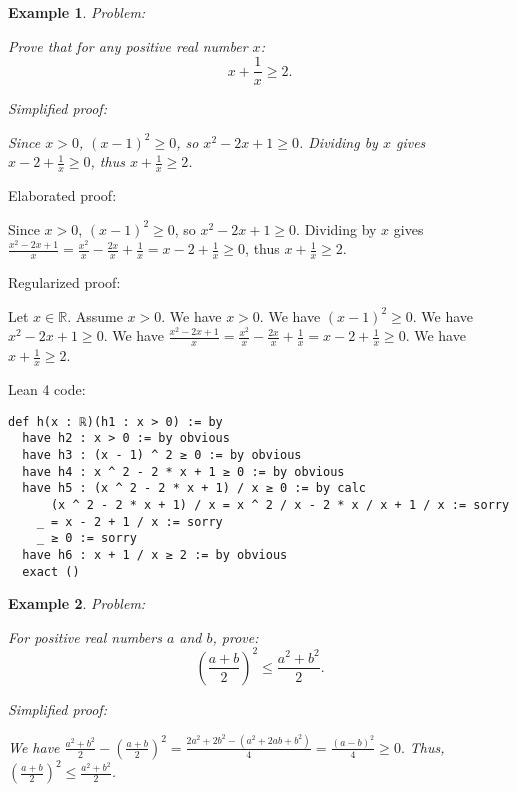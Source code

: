\documentclass{article}
\newtheorem{example}{Example}
\begin{document}
\begin{example}
Problem:
\begin{tcolorbox}[colback=yellow!10, width=\linewidth]
Prove that for any positive real number $x$:
    $$x + \frac{1}{x} \geq 2.$$
\end{tcolorbox}

Simplified proof:
\begin{tcolorbox}[colback=blue!10, width=\linewidth]
Since $x>0$, $(x-1)^2 \ge 0$, so $x^2 - 2x + 1 \ge 0$. Dividing by $x$ gives $x - 2 + \frac{1}{x} \ge 0$, thus $x + \frac{1}{x} \ge 2$.
\end{tcolorbox}
\end{example}

Elaborated proof:
\begin{tcolorbox}[colback=green!10, width=\linewidth]
Since $x>0$, $(x-1)^2 \ge 0$, so $x^2 - 2x + 1 \ge 0$. Dividing by $x$ gives $\frac{x^2 - 2x + 1}{x} = \frac{x^2}{x} - \frac{2x}{x} + \frac{1}{x} = x - 2 + \frac{1}{x} \ge 0$, thus $x + \frac{1}{x} \ge 2$.
\end{tcolorbox}

Regularized proof:
\begin{tcolorbox}[colback=red!10, width=\linewidth]
Let $x\in\mathbb{R}$. Assume $x > 0$.
We have $x > 0$. We have ${(x-1)}^2 \ge 0$. We have $x^2 - 2x + 1 \ge 0$. We have $\frac{x^2 - 2x + 1}{x} = \frac{x^2}{x} - \frac{2x}{x} + \frac{1}{x} = x - 2 + \frac{1}{x} \ge 0$. We have $x + \frac{1}{x} \ge 2$.
\end{tcolorbox}

Lean 4 code:
\begin{tcolorbox}[colback=white!10, width=\linewidth]
\begin{lstlisting}[language=Lean4]
def h(x : ℝ)(h1 : x > 0) := by
  have h2 : x > 0 := by obvious
  have h3 : (x - 1) ^ 2 ≥ 0 := by obvious
  have h4 : x ^ 2 - 2 * x + 1 ≥ 0 := by obvious
  have h5 : (x ^ 2 - 2 * x + 1) / x ≥ 0 := by calc
      (x ^ 2 - 2 * x + 1) / x = x ^ 2 / x - 2 * x / x + 1 / x := sorry
    _ = x - 2 + 1 / x := sorry
    _ ≥ 0 := sorry
  have h6 : x + 1 / x ≥ 2 := by obvious
  exact ()
\end{lstlisting}
\end{tcolorbox}


\begin{example}
Problem:
\begin{tcolorbox}[colback=yellow!10, width=\linewidth]
For positive real numbers $a$ and $b$, prove:
    $$\left(\frac{a+b}{2}\right)^2 \leq \frac{a^2+b^2}{2}.$$
\end{tcolorbox}

Simplified proof:
\begin{tcolorbox}[colback=blue!10, width=\linewidth]
We have
$ \frac{a^2+b^2}{2} - \left(\frac{a+b}{2}\right)^2 = \frac{2a^2+2b^2-(a^2+2ab+b^2)}{4} = \frac{(a-b)^2}{4} \ge 0. $
Thus, $\left(\frac{a+b}{2}\right)^2 \leq \frac{a^2+b^2}{2}$.
\end{tcolorbox}
\end{example}
\end{document}

